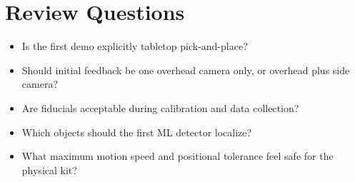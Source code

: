 \documentclass[11pt]{article}
\begin{document}
\section{Review Questions}

\begin{itemize}[leftmargin=*]
    \item Is the first demo explicitly tabletop pick-and-place?
    \item Should initial feedback be one overhead camera only, or overhead plus
          side camera?
    \item Are fiducials acceptable during calibration and data collection?
    \item Which objects should the first ML detector localize?
    \item What maximum motion speed and positional tolerance feel safe for the
          physical kit?
\end{itemize}
\end{document}
